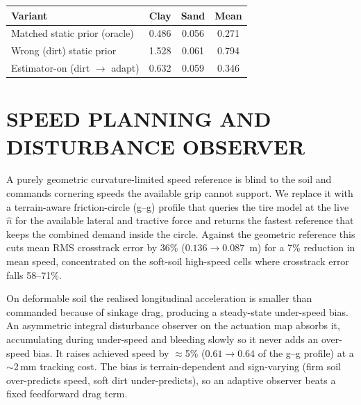 \documentclass{acmd2026_fullpaper}
\begin{document}
\begin{table}[t]
  \begin{center}
    \vspace{1mm}
    \small
    \begin{tabular}{lccc}
      \toprule
      \textbf{Variant} & \textbf{Clay} & \textbf{Sand} & \textbf{Mean}\\
      \midrule
      Matched static prior (oracle)   & 0.486 & 0.056 & 0.271\\
      Wrong (dirt) static prior        & 1.528 & 0.061 & 0.794\\
      Estimator-on (dirt $\to$ adapt)  & 0.632 & 0.059 & 0.346\\
      \bottomrule
    \end{tabular}
    \label{tab:wrongprior}
  \end{center}
\end{table}

\section{SPEED PLANNING AND DISTURBANCE OBSERVER}
\label{sec:speed}
A purely geometric curvature-limited speed reference is blind to the soil and
commands cornering speeds the available grip cannot support. We replace it with
a terrain-aware friction-circle (g--g) profile that queries the tire model at
the live $\hat n$ for the available lateral and tractive force and returns the
fastest reference that keeps the combined demand inside the circle. Against the
geometric reference this cuts mean RMS crosstrack error by 36\%
($0.136\!\to\!0.087$~m) for a 7\% reduction in mean speed, concentrated on the
soft-soil high-speed cells where crosstrack error falls 58--71\%.

On deformable soil the realised longitudinal acceleration is smaller than
commanded because of sinkage drag, producing a steady-state under-speed bias. An
asymmetric integral disturbance observer on the actuation map absorbs it,
accumulating during under-speed and bleeding slowly so it never adds an
over-speed bias. It raises achieved speed by $\approx$5\%
($0.61\!\to\!0.64$ of the g--g profile) at a $\sim$2\,mm tracking cost. The bias
is terrain-dependent and sign-varying (firm soil over-predicts speed, soft dirt
under-predicts), so an adaptive observer beats a fixed feedforward drag term.
\end{document}
